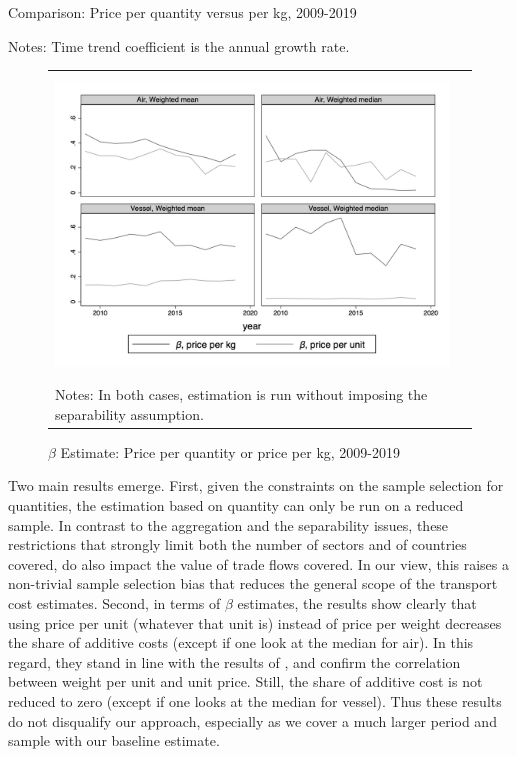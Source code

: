 \documentclass[a4paper,11pt]{article}
\begin{document}
\begin{table}[htbp]
	\caption{Comparison: Price per quantity versus per kg, 2009-2019}
	\begin{center}		
		
%		
{\parbox[l]{12cm}{ \vspace{4pt}\footnotesize{Notes: Time trend coefficient is the annual growth rate.}}}
\end{center}
	\label{tab_comp_wgt_qty}%
\end{table}%

\begin{figure}[htbp]
	\caption{$\beta$ Estimate: Price per quantity or price per kg, 2009-2019}
	\begin{center}
		\begin{tabular}{cc}
			\includegraphics[height=8cm]{../../revised_article/scatter_chronology_non_separe_wgt_non_separe_qy.png}\\
			\multicolumn{2}{l}{{\footnotesize Notes: In both cases, estimation is run without imposing the separability assumption.}}
		\end{tabular}
	\end{center}
		\label{graph_comp_wgt_qty}%
\end{figure}

Two main results emerge. First, given the constraints on the sample selection for quantities, the estimation based on quantity can only be run on a reduced sample. In contrast to the aggregation and the separability issues, these restrictions that strongly limit both the number of sectors and of countries covered, do also impact the value of trade flows covered. In our view, this raises a non-trivial sample selection bias that reduces the general scope of the transport cost estimates. Second, in terms of $\beta$ estimates, the results show clearly that using price per unit (whatever that unit is) instead of price per weight decreases the share of additive costs (except if one look at the median for air). In this regard, they stand in line with the results of \cite{Lashkaripour_JIE2020}, and confirm the correlation between weight per unit and unit price. Still, the share of additive cost is not reduced to zero (except if one looks at the median for vessel). Thus these results do not disqualify our approach, especially as we cover a much larger period and sample with our baseline estimate.
\end{document}

